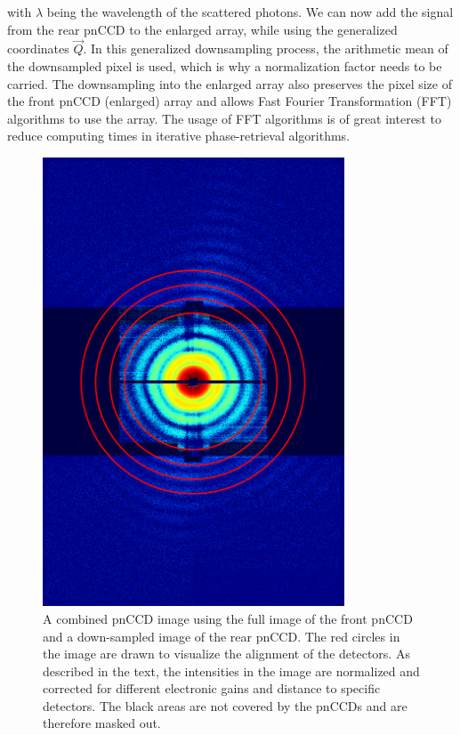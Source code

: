 with $\lambda$ being the wavelength of the scattered photons. We can now add the signal from the rear pnCCD to the enlarged array, while using the generalized coordinates $\vec{Q}$. In this generalized downsampling process, the arithmetic mean of the downsampled pixel is used, which is why a normalization factor needs to be carried. The downsampling into the enlarged array also  preserves the pixel size of the front pnCCD (enlarged) array and allows Fast Fourier Transformation (FFT) algorithms to use the array. The usage of FFT algorithms is of great interest to reduce computing times in iterative phase-retrieval algorithms.\\[1\baselineskip]
%
%
%
\begin{figure}
	\centering
		\includegraphics[width=0.8\textwidth]{images/pnCCD-image-geometry.png}
	\caption[Front and rear pnCCD arranged to combine measured diffraction image.]{A combined pnCCD image using the full image of the front pnCCD and a down-sampled image of the rear pnCCD. The red circles in the image are drawn to visualize the alignment of the detectors. As described in the text, the intensities in the image are normalized and corrected for different electronic gains and distance to specific detectors. The black areas are not covered by the pnCCDs and are therefore masked out.}
	\label{fig:pnCCD-image-aligned}
\end{figure}
